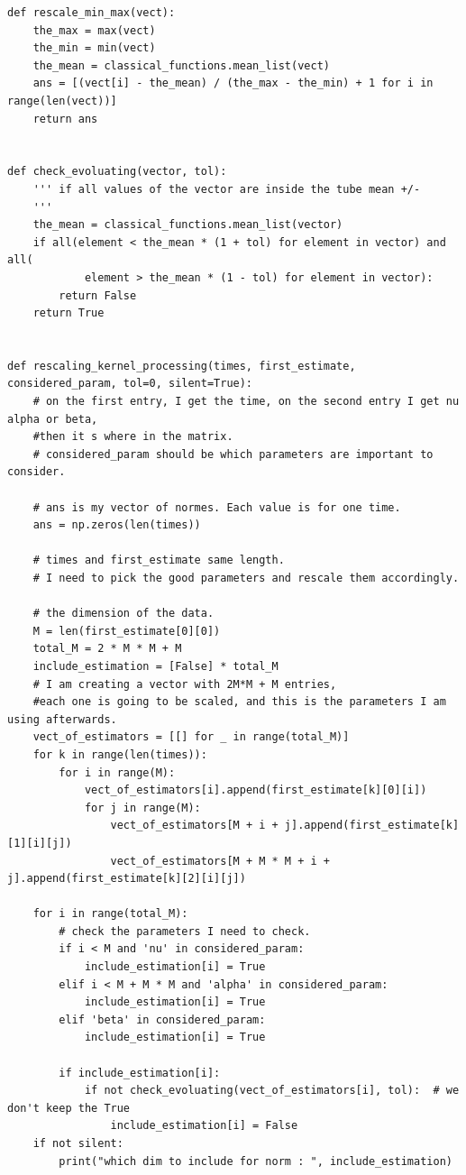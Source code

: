 \documentclass[11pt]{book}
\begin{document}
\begin{Verbatim}[fontsize=\footnotesize]
def rescale_min_max(vect):
    the_max = max(vect)
    the_min = min(vect)
    the_mean = classical_functions.mean_list(vect)
    ans = [(vect[i] - the_mean) / (the_max - the_min) + 1 for i in range(len(vect))]
    return ans


def check_evoluating(vector, tol):
    ''' if all values of the vector are inside the tube mean +/- 
    '''
    the_mean = classical_functions.mean_list(vector)
    if all(element < the_mean * (1 + tol) for element in vector) and all(
            element > the_mean * (1 - tol) for element in vector):
        return False
    return True


def rescaling_kernel_processing(times, first_estimate, considered_param, tol=0, silent=True):
    # on the first entry, I get the time, on the second entry I get nu alpha or beta, 
    #then it s where in the matrix.
    # considered_param should be which parameters are important to consider.

    # ans is my vector of normes. Each value is for one time.
    ans = np.zeros(len(times))

    # times and first_estimate same length.
    # I need to pick the good parameters and rescale them accordingly.

    # the dimension of the data.
    M = len(first_estimate[0][0])
    total_M = 2 * M * M + M
    include_estimation = [False] * total_M
    # I am creating a vector with 2M*M + M entries,
    #each one is going to be scaled, and this is the parameters I am using afterwards.
    vect_of_estimators = [[] for _ in range(total_M)]
    for k in range(len(times)):
        for i in range(M):
            vect_of_estimators[i].append(first_estimate[k][0][i])
            for j in range(M):
                vect_of_estimators[M + i + j].append(first_estimate[k][1][i][j])
                vect_of_estimators[M + M * M + i + j].append(first_estimate[k][2][i][j])

    for i in range(total_M):
        # check the parameters I need to check.
        if i < M and 'nu' in considered_param:
            include_estimation[i] = True
        elif i < M + M * M and 'alpha' in considered_param:
            include_estimation[i] = True
        elif 'beta' in considered_param:
            include_estimation[i] = True

        if include_estimation[i]:
            if not check_evoluating(vect_of_estimators[i], tol):  # we don't keep the True
                include_estimation[i] = False
    if not silent:
        print("which dim to include for norm : ", include_estimation)


\end{Verbatim}
\end{document}
